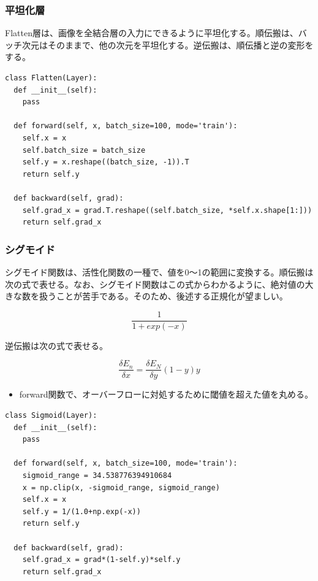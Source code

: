\documentclass[platex,dvipdfmx]{jsarticle}
\begin{document}
\subsubsection{平坦化層}

Flatten層は、画像を全結合層の入力にできるように平坦化する。順伝搬は、バッチ次元はそのままで、他の次元を平坦化する。逆伝搬は、順伝播と逆の変形をする。

\begin{lstlisting}[caption=ex\_advanced.py, label=Flatten]
class Flatten(Layer):
  def __init__(self):
    pass

  def forward(self, x, batch_size=100, mode='train'):
    self.x = x
    self.batch_size = batch_size
    self.y = x.reshape((batch_size, -1)).T
    return self.y
  
  def backward(self, grad):
    self.grad_x = grad.T.reshape((self.batch_size, *self.x.shape[1:]))
    return self.grad_x
\end{lstlisting}

\newpage

\subsubsection{シグモイド}

シグモイド関数は、活性化関数の一種で、値を0〜1の範囲に変換する。順伝搬は次の式で表せる。なお、シグモイド関数はこの式からわかるように、絶対値の大きな数を扱うことが苦手である。そのため、後述する正規化が望ましい。

\[
  \frac{1}{1 + exp(-x)}
\]

逆伝搬は次の式で表せる。

\[
  \frac{\delta E_n}{\delta x} = \frac{\delta E_N}{\delta y}(1-y)y
\]

\begin{itemize}
  \item forward関数で、オーバーフローに対処するために閾値を超えた値を丸める。
\end{itemize}

\begin{lstlisting}[caption=ex.advanced.py, label=Sigmoid]
class Sigmoid(Layer):
  def __init__(self):
    pass

  def forward(self, x, batch_size=100, mode='train'):
    sigmoid_range = 34.538776394910684
    x = np.clip(x, -sigmoid_range, sigmoid_range)
    self.x = x
    self.y = 1/(1.0+np.exp(-x))
    return self.y

  def backward(self, grad):
    self.grad_x = grad*(1-self.y)*self.y
    return self.grad_x
\end{lstlisting}
\end{document}
